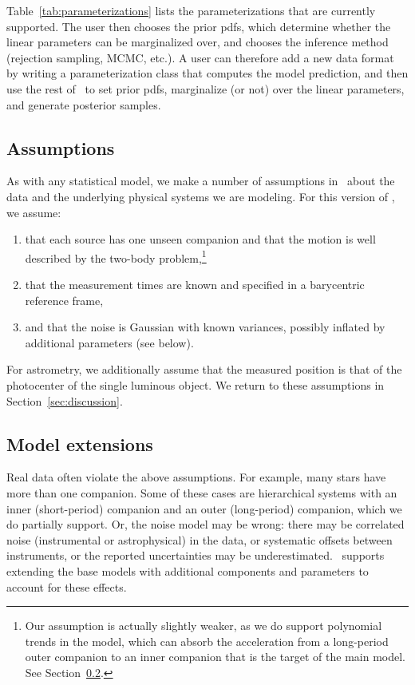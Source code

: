 \documentclass[twocolumn]{AASTeX7/aastex701}
\newcommand{\harv}{\package{harv}}
\begin{document}
Table~\ref{tab:parameterizations} lists the parameterizations that are currently
supported.
The user then chooses the prior pdfs, which determine whether the linear parameters can
be marginalized over, and chooses the inference method (rejection sampling, MCMC, etc.).
A user can therefore add a new data format by writing a parameterization class that
computes the model prediction, and then use the rest of \harv\ to set prior pdfs,
marginalize (or not) over the linear parameters, and generate posterior samples.



\subsection{Assumptions}
\label{sec:design-assumptions}

As with any statistical model, we make a number of assumptions in \harv\ about the data
and the underlying physical systems we are modeling.
For this version of \harv, we assume:
\begin{enumerate}
  \item that each source has one unseen companion and that the motion is well described
  by the two-body problem,\footnote{Our assumption is actually slightly weaker, as we do
  support polynomial trends in the model, which can absorb the acceleration from a
  long-period outer companion to an inner companion that is the target of the main
  model. See Section~\ref{sec:design-extensions}.}
  \item that the measurement times are known and specified in a barycentric reference
  frame,
  \item and that the noise is Gaussian with known variances, possibly inflated by
  additional parameters (see below).
\end{enumerate}
For astrometry, we additionally assume that the measured position is that of the
photocenter of the single luminous object.
We return to these assumptions in Section~\ref{sec:discussion}.

\subsection{Model extensions}
\label{sec:design-extensions}

Real data often violate the above assumptions.
For example, many stars have more than one companion.
Some of these cases are hierarchical systems with an inner (short-period) companion and
an outer (long-period) companion, which we do partially support.
Or, the noise model may be wrong: there may be correlated noise (instrumental or
astrophysical) in the data, or systematic offsets between instruments, or the reported
uncertainties may be underestimated.
\harv\ supports extending the base models with additional components and parameters to
account for these effects.
\end{document}
